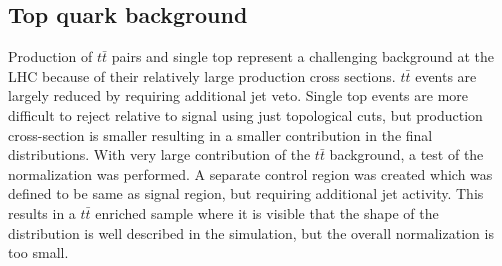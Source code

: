 \subsection{Top quark background}

Production of $t\bar{t}$ pairs and single top represent a challenging background at the LHC because of their relatively large production cross sections. $t\bar{t}$ events are largely reduced by requiring additional jet veto. Single top events are more difficult to reject relative to signal using just topological cuts, but production cross-section is smaller resulting in a smaller contribution in the final distributions.
With very large contribution of the $t\bar{t}$ background, a test of the normalization was performed. A separate control region was created which was defined to be same as signal region, but requiring additional jet activity. This results in a $t\bar{t}$ enriched sample where it is visible that the shape of the distribution is well described in the simulation, but the overall normalization is too small. 
